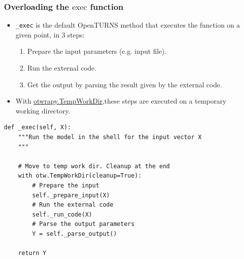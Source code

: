 \documentclass[10pt, aspectratio=169]{beamer}
\begin{document}
\begin{frame}[fragile]
\frametitle{Overloading the $\mathrm{exec}$ function}
\begin{itemize}
	\item \texttt{\_exec} is the default OpenTURNS method that executes the function
  on a given point, in 3 steps:
	\begin{enumerate}
		\item Prepare the input parameters (e.g. input file).
		\item Run the external code.
		\item Get the output by parsing the result given by the external code.
	\end{enumerate}
\vfill
	\item With \href{http://openturns.github.io/otwrapy/master/_generated/otwrapy.TempWorkDir.html}{otwrapy.TempWorkDir},these steps are executed on a temporary working directory.
\end{itemize}

\begin{Verbatim}[xleftmargin=10mm]
def _exec(self, X):
    """Run the model in the shell for the input vector X
    """

    # Move to temp work dir. Cleanup at the end
    with otw.TempWorkDir(cleanup=True):
        # Prepare the input
        self._prepare_input(X)
        # Run the external code
        self._run_code(X)
        # Parse the output parameters
        Y = self._parse_output()

    return Y
\end{Verbatim}
\end{frame}
\end{document}
